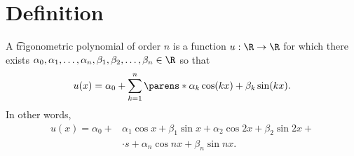 
\section*{Definition}

A \t{trigonometric polynomial} of order $n$ is a function $u: \R  \to \R $ for which there exists $\alpha _0, \alpha _1, \dots , \alpha _n, \beta _1, \beta _2, \dots , \beta _n \in \R $ so that
\[
u(x) = \alpha _0 + \sum_{k = 1}^{n} \parens*{\alpha _k \cos(kx) + \beta _k \sin(kx)}.
\]
In other words,
\[
\begin{aligned}
u(x) = \alpha _0 +& \alpha _1\cos x + \beta _1\sin x + \alpha _2 \cos2x + \beta _2 \sin2x + \\ &\cdot s + \alpha _n \cos nx + \beta _n \sin nx.
\end{aligned}
\]

\blankpage